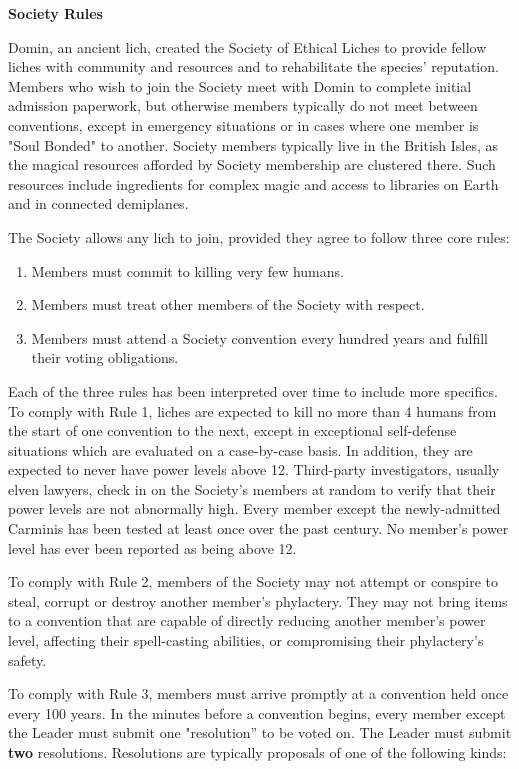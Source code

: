 \documentclass[blue]{Sel}
\begin{document}
\name{\bSociety{}}
\textbf{Society Rules}

Domin, an ancient lich, created the Society of Ethical Liches to provide fellow liches with community and resources and to rehabilitate the species' reputation. Members who wish to join the Society meet with Domin to complete initial admission paperwork, but otherwise members typically do not meet between conventions, except in emergency situations or in cases where one member is "Soul Bonded" to another. Society members typically live in the British Isles, as the magical resources afforded by Society membership are clustered there. Such resources include ingredients for complex magic and access to libraries on Earth and in connected demiplanes.

The Society allows any lich to join, provided they agree to follow three core rules:

\begin{enumerate}
\item Members must commit to killing very few humans.
\item Members must treat other members of the Society with respect.
\item Members must attend a Society convention every hundred years and fulfill their voting obligations.
\end{enumerate}

Each of the three rules has been interpreted over time to include more specifics. To comply with Rule 1, liches are expected to kill no more than 4 humans from the start of one convention to the next, except in exceptional self-defense situations which are evaluated on a case-by-case basis. In addition, they are expected to never have power levels above 12. Third-party investigators, usually elven lawyers, check in on the Society's members at random to verify that their power levels are not abnormally high. Every member except the newly-admitted Carminis has been tested at least once over the past century. No member's power level has ever been reported as being above 12.

To comply with Rule 2, members of the Society may not attempt or conspire to steal, corrupt or destroy another member's phylactery. They may not bring items to a convention that are capable of directly reducing another member's power level, affecting their spell-casting abilities, or compromising their phylactery's safety.

To comply with Rule 3, members must arrive promptly at a convention held once every 100 years. In the minutes before a convention begins, every member except the Leader must submit one "resolution'' to be voted on. The Leader must submit {\bf two} resolutions. Resolutions are typically proposals of one of the following kinds:
\end{document}

